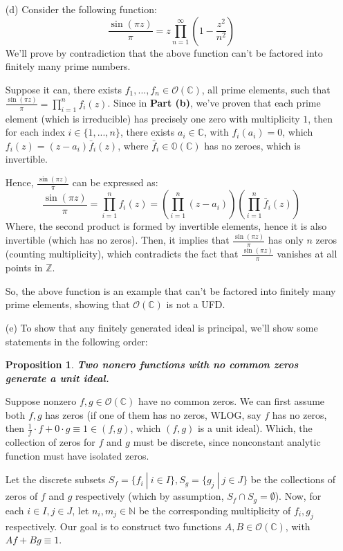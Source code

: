 \documentclass{article}
\newtheorem{proposition}{Proposition}
\begin{document}
\begin{itemize}
    \hfil

    \item[(d)] Consider the following function: 
    $$\frac{\sin(\pi z)}{\pi}=z\prod_{n=1}^{\infty}\left(1-\frac{z^2}{n^2}\right)$$
    We'll prove by contradiction that the above function can't be factored into finitely many prime numbers.
    
    Suppose it can, there exists $f_1,...,f_n\in\mathcal{O}(\mathbb{C})$, all prime elements, such that $\frac{\sin(\pi z)}{\pi}=\prod_{i=1}^{n}f_i(z)$.
    Since in \textbf{Part (b)}, we've proven that each prime element (which is irreducible) has precisely one zero with multiplicity $1$, then for each index $i\in\{1,...,n\}$,
    there exists $a_i\in\mathbb{C}$, with $f_i(a_i)=0$, which $f_i(z)=(z-a_i)\bar{f}_i(z)$, where $\bar{f}_i\in\mathbb{O}(\mathbb{C})$ has no zeroes, which is invertible.

    Hence, $\frac{\sin(\pi z)}{\pi}$ can be expressed as:
    $$\frac{\sin(\pi z)}{\pi}=\prod_{i=1}^{n}f_i(z) = \left(\prod_{i=1}^{n}(z-a_i)\right)\left(\prod_{i=1}^{n}\bar{f}_i(z)\right)$$
    Where, the second product is formed by invertible elements, hence it is also invertible (which has no zeros). Then, it implies that $\frac{\sin(\pi z)}{\pi}$ has only $n$ zeros (counting multiplicity), which contradicts the fact that $\frac{\sin(\pi z)}{\pi}$ vanishes at all points in $\mathbb{Z}$.

    So, the above function is an example that can't be factored into finitely many prime elements, showing that $\mathcal{O}(\mathbb{C})$ is not a UFD.

    \hfil

    \item[(e)] To show that any finitely generated ideal is principal, we'll show some statements in the following order:

    \begin{proposition}
        \textbf{Two nonero functions with no common zeros generate a unit ideal.}
    \end{proposition}

    Suppose nonzero $f,g\in\mathcal{O}(\mathbb{C})$ have no common zeros. We can first assume both $f,g$ has zeros (if one of them has no zeros, WLOG, say $f$ has no zeros, then $\frac{1}{f}\cdot f+0\cdot g \equiv 1\in (f,g)$, which $(f,g)$ is a unit ideal).
    Which, the collection of zeros for $f$ and $g$ must be discrete, since nonconstant analytic function must have isolated zeros.

    Let the discrete subsets $S_f=\{f_i\ |\ i\in I\}, S_g=\{g_j\ |\ j\in J\}$ be the collections of zeros of $f$ and $g$ respectively (which by assumption, $S_f\cap S_g=\emptyset$). Now, for each $i\in I, j\in J$, let $n_i,m_j\in\mathbb{N}$ be the corresponding multiplicity of $f_i,g_j$ respectively.
    Our goal is to construct two functions $A,B\in\mathcal{O}(\mathbb{C})$, with $Af+Bg\equiv 1$.


\end{itemize}
\end{document}
